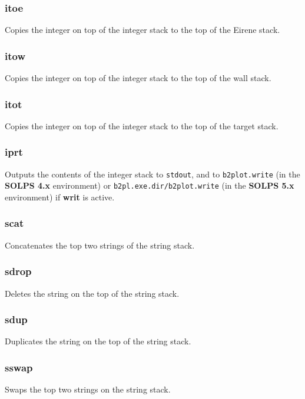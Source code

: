 \documentclass[a4paper,10pt]{report}
\newcommand\SOLPSfour{{\bf SOLPS 4.x} }
\newcommand\SOLPSfive{{\bf SOLPS 5.x} }
\begin{document}
\subsubsection{itoe}\label{sec:itoe}
Copies the integer on top of the integer stack to the top of the Eirene stack.

\subsubsection{itow}\label{sec:itow}
Copies the integer on top of the integer stack to the top of the wall stack.

\subsubsection{itot}\label{sec:itot}
Copies the integer on top of the integer stack to the top of the target stack.

\subsubsection{iprt}\label{sec:iprt}
Outputs the contents of the integer stack to \verb:stdout:, and to \verb:b2plot.write:
(in the \SOLPSfour environment) or \verb:b2pl.exe.dir/b2plot.write:
(in the \SOLPSfive environment) if {\bf writ} is active.

\subsubsection{scat}\label{sec:scat}
Concatenates the top two strings of the string stack.

\subsubsection{sdrop}\label{sec:sdrop}
Deletes the string on the top of the string stack.

\subsubsection{sdup}\label{sec:sdup}
Duplicates the string on the top of the string stack.

\subsubsection{sswap}\label{sec:sswap}
Swaps the top two strings on the string stack.
\end{document}
